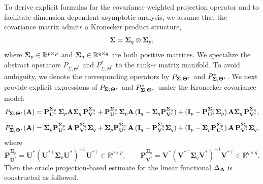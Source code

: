 \documentclass[authoryear,preprint,review,12pt]{elsarticle}
\begin{document}
	To derive explicit formulas for the covariance-weighted projection operator 
	and to facilitate dimension-dependent asymptotic analysis, 
	we assume that the covariance matrix admits a Kronecker product structure,
	\[
	\mathbf{ \Sigma} = \mathbf{ \Sigma}_q \otimes \mathbf{ \Sigma}_p,
	\] 
	where $\mathbf{ \Sigma}_p\in\mathbb{R}^{p\times p}$ and $\mathbf{ \Sigma}_q\in\mathbb{R}^{q\times q}$ are both positive matrices.  
	We specialize the abstract operators 
	$P_{\Sigma,\Theta^\ast}$ and $P_{\Sigma,\Theta^\ast}^\ast$ 
	to the rank-$r$ matrix manifold. 
	To avoid ambiguity, we denote the corresponding operators by
	$P_{\mathbf{ \Sigma},\mathbf{\Theta}^\ast}$ and 
	$P_{\mathbf{ \Sigma},\mathbf{\Theta}^\ast}^\ast$.  
	We next provide explicit expressions of $P_{\mathbf{ \Sigma},\mathbf{\Theta}^\ast}$ and 
	$P_{\mathbf{ \Sigma},\mathbf{\Theta}^\ast}^\ast$
	under the Kronecker covariance model:
	\begin{equation*}
		\begin{aligned}
			P_{\mathbf{ \Sigma},\mathbf\Theta^\ast}(\mathbf A)
			&=
			\mathbf P_{\mathbf U^\ast}^{\mathbf \Sigma_p}
			\,\mathbf \Sigma_p \mathbf A \mathbf \Sigma_q\,
			\mathbf P_{\mathbf V^\ast}^{\mathbf \Sigma_q} 
			+
			\mathbf P_{\mathbf U^\ast}^{\mathbf \Sigma_p}
			\,\mathbf \Sigma_p \mathbf A\,
			(\mathbf I_q - \mathbf \Sigma_q \mathbf P_{\mathbf V^\ast}^{\mathbf \Sigma_q}) 
			+
			(\mathbf I_p - \mathbf P_{\mathbf U^\ast}^{\mathbf \Sigma_p}\mathbf \Sigma_p)
			\,\mathbf A \mathbf \Sigma_q\,
			\mathbf P_{\mathbf V^\ast}^{\mathbf \Sigma_q},
			\\[1.2ex]
			P_{\mathbf{ \Sigma},\mathbf\Theta^\ast}^{\ast}(\mathbf A)
			&=
			\mathbf \Sigma_p \mathbf P_{\mathbf U^\ast}^{\mathbf \Sigma_p}
			\,\mathbf A\,
			\mathbf P_{\mathbf V^\ast}^{\mathbf \Sigma_q}\mathbf \Sigma_q 
			+
			\mathbf \Sigma_p \mathbf P_{\mathbf U^\ast}^{\mathbf \Sigma_p}
			\,\mathbf A\,
			(\mathbf I_q - \mathbf P_{\mathbf V^\ast}^{\mathbf \Sigma_q}\mathbf \Sigma_q) 
			+
			(\mathbf I_p - \mathbf \Sigma_p \mathbf P_{\mathbf U^\ast}^{\mathbf \Sigma_p})
			\,\mathbf A\,
			\mathbf P_{\mathbf V^\ast}^{\mathbf \Sigma_q}\mathbf \Sigma_q .
		\end{aligned}
	\end{equation*}
	where
	\[
	\mathbf P_{\mathbf U^\ast}^{\mathbf \Sigma_p}
	=
	\mathbf U^\ast(\mathbf U^{\ast\top} \mathbf \Sigma_p \mathbf U^\ast)^{-1}\mathbf U^{\ast\top}
	\in \mathbb R^{p\times p},
	\qquad
	\mathbf P_{\mathbf V^\ast}^{\mathbf \Sigma_q}
	=
	\mathbf V^\ast(\mathbf V^{\ast\top} \mathbf \Sigma_q \mathbf V^\ast)^{-1}\mathbf V^{\ast\top}
	\in \mathbb R^{q\times q}.
	\]
	Then the oracle projection-based estimate for the linear functional
	$\Delta_{\mathbf{A}}$ is constructed as followed.  
\end{document}
